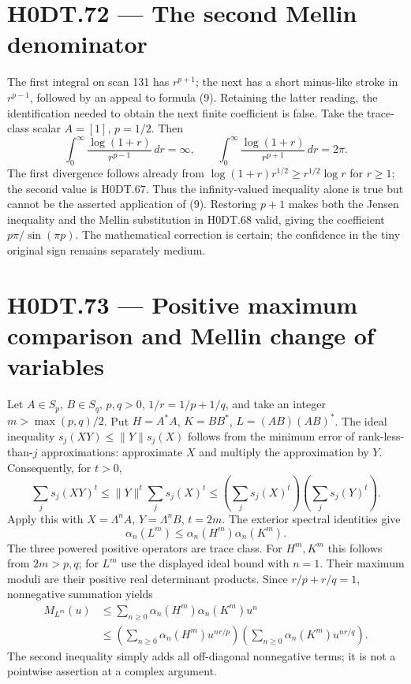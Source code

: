 \section*{H0DT.72 --- The second Mellin denominator}
The first integral on scan 131 has $r^{p+1}$; the next has a short minus-like stroke in $r^{p-1}$, followed by an appeal to formula (9). Retaining the latter reading, the identification needed to obtain the next finite coefficient is false. Take the trace-class scalar $A=[1]$, $p=1/2$. Then
\[
 \int_0^\infty\frac{\log(1+r)}{r^{p-1}}\,dr=\infty,
 \qquad
 \int_0^\infty\frac{\log(1+r)}{r^{p+1}}\,dr=2\pi.
\]
The first divergence follows already from $\log(1+r)r^{1/2}\ge r^{1/2}\log r$ for $r\ge1$; the second value is H0DT.67. Thus the infinity-valued inequality alone is true but cannot be the asserted application of (9). Restoring $p+1$ makes both the Jensen inequality and the Mellin substitution in H0DT.68 valid, giving the coefficient $p\pi/\sin(\pi p)$. The mathematical correction is certain; the confidence in the tiny original sign remains separately medium.

\section*{H0DT.73 --- Positive maximum comparison and Mellin change of variables}
Let $A\in S_p$, $B\in S_q$, $p,q>0$, $1/r=1/p+1/q$, and take an integer $m>\max(p,q)/2$. Put $H=A^*A$, $K=BB^*$, $L=(AB)(AB)^*$. The ideal inequality $s_j(XY)\le\|Y\|s_j(X)$ follows from the minimum error of rank-less-than-$j$ approximations: approximate $X$ and multiply the approximation by $Y$. Consequently, for $t>0$,
\[
 \sum_js_j(XY)^t\le\|Y\|^t\sum_js_j(X)^t
 \le\left(\sum_js_j(X)^t\right)\left(\sum_js_j(Y)^t\right).
\]
Apply this with $X=\Lambda^n A$, $Y=\Lambda^n B$, $t=2m$. The exterior spectral identities give
\[
 \alpha_n(L^m)\le\alpha_n(H^m)\alpha_n(K^m).
\]
The three powered positive operators are trace class. For $H^m,K^m$ this follows from $2m>p,q$; for $L^m$ use the displayed ideal bound with $n=1$. Their maximum moduli are their positive real determinant products. Since $r/p+r/q=1$, nonnegative summation yields
\[
 \begin{split}
 M_{L^m}(u)&\le\sum_{n\ge0}\alpha_n(H^m)\alpha_n(K^m)u^n\\
 &\le\left(\sum_{n\ge0}\alpha_n(H^m)u^{nr/p}\right)
       \left(\sum_{n\ge0}\alpha_n(K^m)u^{nr/q}\right).
 \end{split}
\]
The second inequality simply adds all off-diagonal nonnegative terms; it is not a pointwise assertion at a complex argument.


